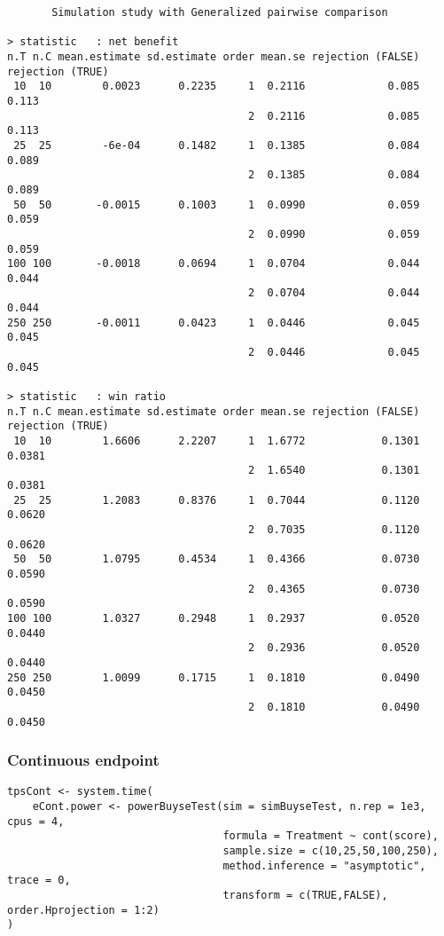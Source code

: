 \documentclass[12pt]{article}
\begin{document}
\begin{verbatim}
       Simulation study with Generalized pairwise comparison

> statistic   : net benefit
n.T n.C mean.estimate sd.estimate order mean.se rejection (FALSE) rejection (TRUE)
 10  10        0.0023      0.2235     1  0.2116             0.085            0.113
                                      2  0.2116             0.085            0.113
 25  25        -6e-04      0.1482     1  0.1385             0.084            0.089
                                      2  0.1385             0.084            0.089
 50  50       -0.0015      0.1003     1  0.0990             0.059            0.059
                                      2  0.0990             0.059            0.059
100 100       -0.0018      0.0694     1  0.0704             0.044            0.044
                                      2  0.0704             0.044            0.044
250 250       -0.0011      0.0423     1  0.0446             0.045            0.045
                                      2  0.0446             0.045            0.045

> statistic   : win ratio
n.T n.C mean.estimate sd.estimate order mean.se rejection (FALSE) rejection (TRUE)
 10  10        1.6606      2.2207     1  1.6772            0.1301           0.0381
                                      2  1.6540            0.1301           0.0381
 25  25        1.2083      0.8376     1  0.7044            0.1120           0.0620
                                      2  0.7035            0.1120           0.0620
 50  50        1.0795      0.4534     1  0.4366            0.0730           0.0590
                                      2  0.4365            0.0730           0.0590
100 100        1.0327      0.2948     1  0.2937            0.0520           0.0440
                                      2  0.2936            0.0520           0.0440
250 250        1.0099      0.1715     1  0.1810            0.0490           0.0450
                                      2  0.1810            0.0490           0.0450
\end{verbatim}

\clearpage

\subsubsection{Continuous endpoint}
\label{sec:org4e2f1b1}
\lstset{language=r,label= ,caption= ,captionpos=b,numbers=none}
\begin{lstlisting}
tpsCont <- system.time(
	eCont.power <- powerBuyseTest(sim = simBuyseTest, n.rep = 1e3, cpus = 4,
								  formula = Treatment ~ cont(score), 
								  sample.size = c(10,25,50,100,250), 
								  method.inference = "asymptotic", trace = 0,
								  transform = c(TRUE,FALSE), order.Hprojection = 1:2)
)
\end{lstlisting}
\end{document}
